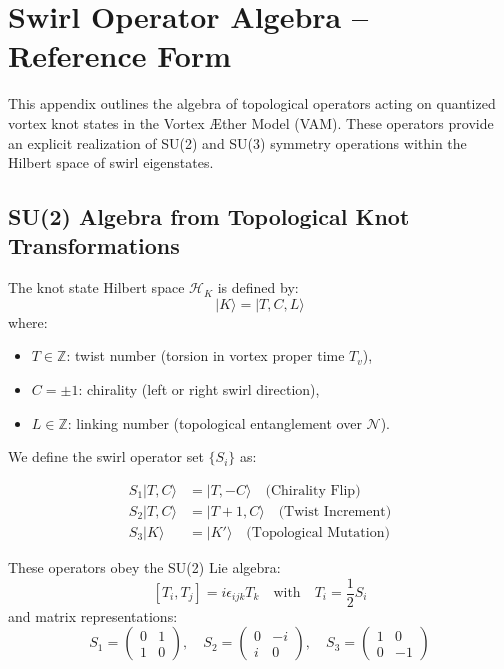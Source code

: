 \documentclass[preprint]{revtex4-2}
\begin{document}
        \section{Swirl Operator Algebra – Reference Form}\label{sec:swirl_operator_algebra}
            This appendix outlines the algebra of topological operators acting on quantized vortex knot states in the Vortex \AE{}ther Model (VAM). These operators provide an explicit realization of SU(2) and SU(3) symmetry operations within the Hilbert space of swirl eigenstates.
        
            \subsection{SU(2) Algebra from Topological Knot Transformations}
        
            The knot state Hilbert space \( \mathcal{H}_K \) is defined by:
            \[
            |K\rangle = |T, C, L\rangle
            \]
            where:
            \begin{itemize}
                \item \( T \in \mathbb{Z} \): twist number (torsion in vortex proper time \( T_v \)),
                \item \( C = \pm 1 \): chirality (left or right swirl direction),
                \item \( L \in \mathbb{Z} \): linking number (topological entanglement over \( \mathcal{N} \)).
            \end{itemize}
        
            We define the swirl operator set \( \{S_i\} \) as:
        
            \begin{align}
            S_1 |T, C\rangle &= |T, -C\rangle \quad \text{(Chirality Flip)} \\
            S_2 |T, C\rangle &= |T+1, C\rangle \quad \text{(Twist Increment)} \\
            S_3 |K\rangle &= |K'\rangle \quad \text{(Topological Mutation)}
            \end{align}
        
            These operators obey the SU(2) Lie algebra:
            \[
            [T_i, T_j] = i \epsilon_{ijk} T_k \quad \text{with} \quad T_i = \frac{1}{2} S_i
            \]
            and matrix representations:
            \[
            S_1 = \begin{pmatrix} 0 & 1 \\ 1 & 0 \end{pmatrix}, \quad
            S_2 = \begin{pmatrix} 0 & -i \\ i & 0 \end{pmatrix}, \quad
            S_3 = \begin{pmatrix} 1 & 0 \\ 0 & -1 \end{pmatrix}
            \]
        
\end{document}
